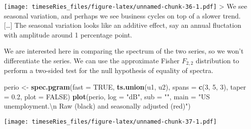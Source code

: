\documentclass[]{book}
\newenvironment{Shaded}{\begin{snugshade}}{\end{snugshade}}
\newcommand{\KeywordTok}[1]{\textcolor[rgb]{0.13,0.29,0.53}{\textbf{#1}}}
\newcommand{\DataTypeTok}[1]{\textcolor[rgb]{0.13,0.29,0.53}{#1}}
\newcommand{\DecValTok}[1]{\textcolor[rgb]{0.00,0.00,0.81}{#1}}
\newcommand{\FloatTok}[1]{\textcolor[rgb]{0.00,0.00,0.81}{#1}}
\newcommand{\CharTok}[1]{\textcolor[rgb]{0.31,0.60,0.02}{#1}}
\newcommand{\StringTok}[1]{\textcolor[rgb]{0.31,0.60,0.02}{#1}}
\newcommand{\OtherTok}[1]{\textcolor[rgb]{0.56,0.35,0.01}{#1}}
\newcommand{\NormalTok}[1]{#1}
\begin{document}
\texttt{[image: timeseRies\_files/figure-latex/unnamed-chunk-36-1.pdf]}
\textgreater{} We see seasonal variation, and perhaps we see business
cycles on top of a slower trend. {[}\ldots{}{]} The seasonal variation
looks like an additive effect, say an annual fluctation with amplitude
around 1 percentage point.

We are interested here in comparing the spectrum of the two series, so
we won't differentiate the series. We can use the approximate Fisher
\(F_{2,2}\) distribution to perform a two-sided test for the null
hypothesis of equality of spectra.

\begin{Shaded}
\begin{Highlighting}[]
\NormalTok{perio <-}\StringTok{ }\KeywordTok{spec.pgram}\NormalTok{(}\DataTypeTok{fast =} \OtherTok{TRUE}\NormalTok{, }\KeywordTok{ts.union}\NormalTok{(u1, u2), }\DataTypeTok{spans =} \KeywordTok{c}\NormalTok{(}\DecValTok{3}\NormalTok{, }\DecValTok{5}\NormalTok{, }\DecValTok{3}\NormalTok{), }\DataTypeTok{taper =} \FloatTok{0.2}\NormalTok{, }
    \DataTypeTok{plot =} \OtherTok{FALSE}\NormalTok{)}
\KeywordTok{plot}\NormalTok{(perio, }\DataTypeTok{log =} \StringTok{"dB"}\NormalTok{, }\DataTypeTok{sub =} \StringTok{""}\NormalTok{, }\DataTypeTok{main =} \StringTok{"US unemployment.}\CharTok{\textbackslash{}n}\StringTok{ Raw (black) and seasonally adjusted (red)"}\NormalTok{)}
\end{Highlighting}
\end{Shaded}

\texttt{[image: timeseRies\_files/figure-latex/unnamed-chunk-37-1.pdf]}
\end{document}
